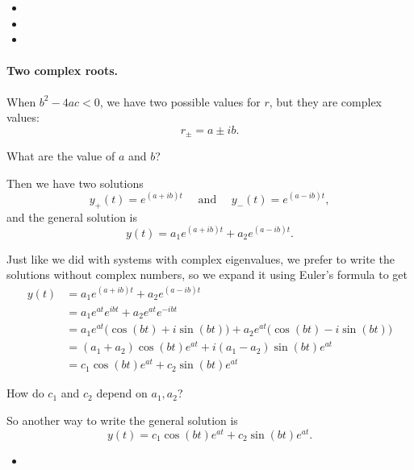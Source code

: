 \begin{video}
\begin{itemize}
	\item {}
	\item {}
	\item {}
\end{itemize}	
\end{video}



\paragraph{\color{cyan}Two complex roots.} When $b^2-4ac<0$, we have two possible values for $r$, but they are complex values:
$$
r_{\pm} = a \pm ib.
$$
\begin{graybox}
What are the value of $a$ and $b$?	
\end{graybox}

Then we have two solutions
$$
y_{+}(t) = e^{(a+ib) t} \quad \text{ and } \quad y_{-}(t) = e^{(a-ib) t},
$$
and the general solution is
$$
y(t) = a_1 e^{(a+ib) t}  + a_2 e^{(a-ib) t}.
$$

Just like we did with systems with complex eigenvalues, we prefer to write the solutions without complex numbers, so we expand it using Euler's formula to get
\begin{align*}
y(t) 	& = a_1 e^{(a+ib) t}  + a_2 e^{(a-ib) t} \\
		& = a_1 e^{at}e^{ibt}  + a_2 e^{at}e^{-ibt} \\
		& = a_1 e^{at} \big( \cos(bt) + i \sin(bt) \big)  + a_2 e^{at} \big( \cos(bt) - i \sin(bt) \big) \\
		& = (a_1+a_2)  \cos(bt)e^{at} + i (a_1-a_2)\sin(bt) e^{at} \\
		& = c_1 \cos(bt)e^{at} + c_2\sin(bt) e^{at}
\end{align*}

\begin{graybox}
How do $c_1$ and $c_2$ depend on $a_1,a_2$?	
\end{graybox}

So another way to write the general solution is
$$
y(t) = c_1 \cos(bt)e^{at} + c_2\sin(bt) e^{at}.
$$


\begin{video}
\begin{itemize}
	\item {}
\end{itemize}	
\end{video}




